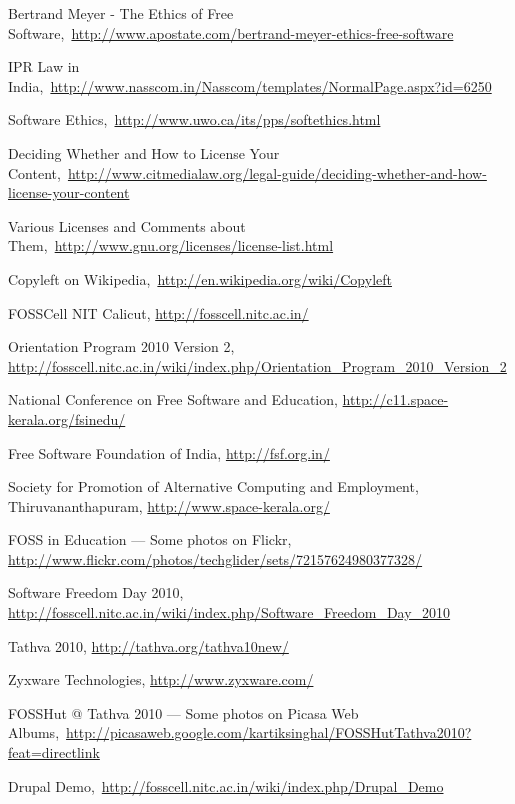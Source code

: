 \begin{thebibliography}{99}

Bertrand Meyer - The Ethics of Free Software,\ \url{http://www.apostate.com/bertrand-meyer-ethics-free-software}

IPR Law in India,\ \url{http://www.nasscom.in/Nasscom/templates/NormalPage.aspx?id=6250}

Software Ethics,\ \url{http://www.uwo.ca/its/pps/softethics.html}

Deciding Whether and How to License Your Content,\ \url{http://www.citmedialaw.org/legal-guide/deciding-whether-and-how-license-your-content}

Various Licenses and Comments about Them,\ \url{http://www.gnu.org/licenses/license-list.html}

Copyleft on Wikipedia,\ \url{http://en.wikipedia.org/wiki/Copyleft}

FOSSCell NIT Calicut, \url{http://fosscell.nitc.ac.in/}

Orientation Program 2010 Version 2, \url{http://fosscell.nitc.ac.in/wiki/index.php/Orientation_Program_2010_Version_2}

National Conference on Free Software and Education, \url{http://c11.space-kerala.org/fsinedu/}

Free Software Foundation of India, \url{http://fsf.org.in/}

Society for Promotion of Alternative Computing and Employment, Thiruvananthapuram, \url{http://www.space-kerala.org/}

FOSS in Education --- Some photos on Flickr, \url{http://www.flickr.com/photos/techglider/sets/72157624980377328/}

Software Freedom Day 2010, \url{http://fosscell.nitc.ac.in/wiki/index.php/Software_Freedom_Day_2010}

Tathva 2010, \url{http://tathva.org/tathva10new/}

Zyxware Technologies, \url{http://www.zyxware.com/}

FOSSHut @ Tathva 2010 --- Some photos on Picasa Web Albums,\ \url{http://picasaweb.google.com/kartiksinghal/FOSSHutTathva2010?feat=directlink}

Drupal Demo,\ \url{http://fosscell.nitc.ac.in/wiki/index.php/Drupal_Demo}

\end{thebibliography}
